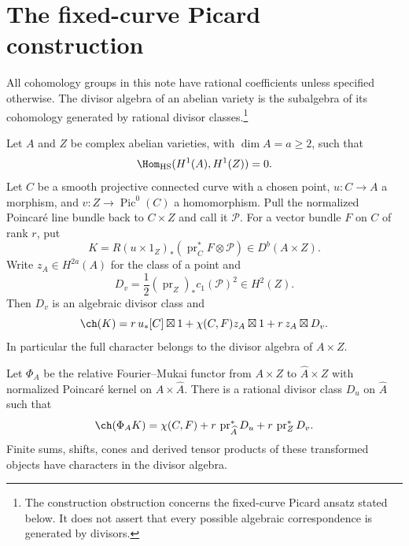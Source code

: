 \providecommand{\td}{\operatorname{td}}
\providecommand{\Lie}{\operatorname{Lie}}
\providecommand{\Sym}{\operatorname{Sym}}
\section{The fixed-curve Picard construction}

All cohomology groups in this note have rational coefficients unless
specified otherwise. The divisor algebra of an abelian variety is the
subalgebra of its cohomology generated by rational divisor classes.\footnote{The construction obstruction concerns the fixed-curve Picard ansatz stated below. It does not assert that every possible algebraic correspondence is generated by divisors.}

\begin{theorem}\label{round26:picard:grr}
Let $A$ and $Z$ be complex abelian varieties, with $\dim A=a\ge2$, such that
\[
 \Hom_{\mathrm{HS}}(H^1(A),H^1(Z))=0.
\]
Let $C$ be a smooth projective connected curve with a chosen point,
$u:C\to A$ a morphism, and $v:Z\to\operatorname{Pic}^0(C)$ a homomorphism.
Pull the normalized Poincar\'e line bundle back to $C\times Z$ and call
it $\mathcal P$. For a vector bundle $F$ on $C$ of rank $r$, put
\[
 K=R(u\times1_Z)_*(\operatorname{pr}_C^*F\otimes\mathcal P)
       \in D^b(A\times Z).
\]
Write $z_A\in H^{2a}(A)$ for the class of a point and
\[
 D_v=\frac12(\operatorname{pr}_Z)_*c_1(\mathcal P)^2\in H^2(Z).
\]
Then $D_v$ is an algebraic divisor class and
\begin{equation}\label{round26:picard:character}
 \ch(K)=r\,u_*[C]\boxtimes1
        +\chi(C,F)z_A\boxtimes1
        +r\,z_A\boxtimes D_v.
\end{equation}
In particular the full character belongs to the divisor algebra of
$A\times Z$.

Let $\Phi_A$ be the relative Fourier--Mukai functor from $A\times Z$
to $\widehat A\times Z$ with normalized Poincar\'e kernel on
$A\times\widehat A$. There is a rational divisor class $D_u$ on
$\widehat A$ such that
\begin{equation}\label{round26:picard:fourier-character}
 \ch(\Phi_AK)
   =\chi(C,F)+r\,\operatorname{pr}_{\widehat A}^*D_u
                  +r\,\operatorname{pr}_Z^*D_v.
\end{equation}
Finite sums, shifts, cones and derived tensor products of these
transformed objects have characters in the divisor algebra.
\end{theorem}

